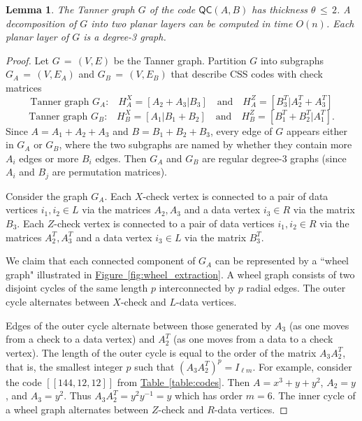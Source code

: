 \documentclass{article}
\newcommand{\be}{\begin{equation}}
\newcommand{\ee}{\end{equation}}
\newcommand{\qc}{\mathsf{QC}(A,B)}
\newtheorem{lemma}{Lemma}
\newcommand{\fig}[1]{\hyperref[fig:#1]{Figure~\ref*{fig:#1}}}
\newcommand{\tab}[1]{\hyperref[table:#1]{Table~\ref*{table:#1}}}
\begin{document}
\begin{lemma}
\label{lem:thickness}
The Tanner graph $G$ of the code $\qc$ has thickness $\theta\,{\le}\, 2$. 
A decomposition of $G$ into two planar layers can be computed in time $O(n)$. 
Each planar layer of $G$ is a degree-3 graph.
\end{lemma}
\begin{proof}
Let $G\,{=}\,(V,E)$ be the Tanner graph. 
Partition $G$ into subgraphs $G_A\,{=}\,(V,E_A)$ and $G_B\,{=}\,(V,E_B)$ that describe CSS codes with check matrices
\be
\mbox{Tanner graph $G_A$:} \quad 
 H^X_A=[A_2+A_3|B_3]  \quad \mbox{and} \quad  H^Z_A = [B_3^T|A_2^T+A_3^T]
\ee
\be
\mbox{Tanner graph $G_B$:} \quad 
H^X_B = [A_1 |B_1+B_2] \quad \mbox{and} \quad H^Z_B = [B_1^T+B_2^T|A_1^T].
\ee
Since $A=A_1+A_2+A_3$ and $B=B_1+B_2+B_3$,
every edge of $G$ appears either in $G_A$ or $G_B$, where the two subgraphs are named by whether they contain more $A_i$ edges or more $B_i$ edges. 
Then  $G_A$ and $G_B$ are regular degree-3 graphs (since $A_i$ and $B_j$ are permutation matrices).

Consider the graph $G_A$. 
Each $X$-check vertex  is connected to
a pair of data vertices $i_1,i_2\in L$ via the matrices $A_2, A_3$
and a data vertex $i_3\in R$ via the matrix $B_3$.
Each $Z$-check vertex is connected to a pair of data vertices $i_1,i_2\in R$ via the matrices $A_2^T, A_3^T$ and a data vertex $i_3\in L$
via the matrix $B_3^T$.

We claim that each connected component of $G_A$ can be represented by a ``wheel graph" illustrated in \fig{wheel_extraction}.
A wheel graph consists of two disjoint cycles of the same length $p$
 interconnected by $p$ radial edges.
The outer cycle alternates between $X$-check 
and $L$-data vertices.

Edges of the outer cycle alternate between those generated by $A_3$ 
(as one moves from a check  to a data vertex)
and $A_2^T$ (as one moves from a data to a check vertex).
The length of the outer cycle is equal to the order of the matrix $A_3 A_2^T$,
that is, the smallest integer $p$ such that $(A_3 A_2^T)^p=I_{\ell m}$.
For example, consider the code $[[144,12,12]]$ from \tab{codes}.
Then $A=x^3+y+y^2$, $A_2=y$, and $A_3=y^2$.
Thus $A_3 A_2^T = y^2 y^{-1} = y$ which has order $m =6$.
The inner cycle of a wheel graph alternates between $Z$-check and $R$-data vertices.


\end{proof}
\end{document}
